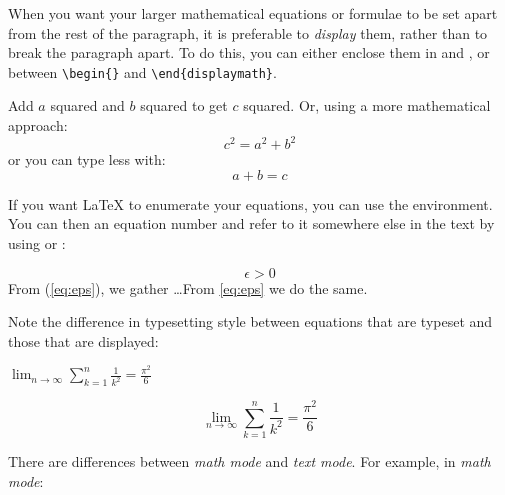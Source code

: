 When you want your larger mathematical equations or formulae to be set apart
from the rest of the paragraph, it is preferable to \emph{display} them,
rather than to break the paragraph apart.
To do this, you can either enclose them
in \ci{[} and \ci{]}, or between
\verb|\begin{|\verb|}| and
\verb|\end{displaymath}|.
\begin{example}
Add $a$ squared and $b$ squared
to get $c$ squared. Or, using
a more mathematical approach:
\begin{displaymath}
c^{2}=a^{2}+b^{2}
\end{displaymath}
or you can type less with:
\[a+b=c\]
\end{example}
If you want \LaTeX{} to enumerate your equations, you can use the
 environment.
You can then  an equation number and refer to it somewhere else in the
text by using  or :
\begin{example}
\begin{equation} \label{eq:eps}
\epsilon > 0
\end{equation}
From (\ref{eq:eps}), we gather 
\ldots{}From \eqref{eq:eps} we
do the same.
\end{example}

Note the difference in typesetting style between equations that are typeset and those
that are displayed:

\begin{example}
$\lim_{n \to \infty} 
\sum_{k=1}^n \frac{1}{k^2} 
= \frac{\pi^2}{6}$
\end{example}
\begin{example}
\begin{displaymath}
\lim_{n \to \infty} 
\sum_{k=1}^n \frac{1}{k^2} 
= \frac{\pi^2}{6}
\end{displaymath}
\end{example}



There are differences between \emph{math mode} and \emph{text mode}. For
example, in \emph{math mode}: 

